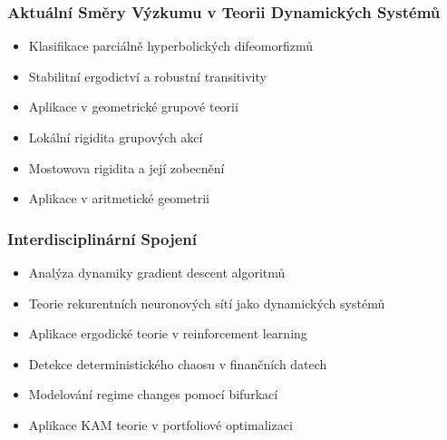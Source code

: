 \subsubsection{Aktuální Směry Výzkumu v Teorii Dynamických Systémů}

\begin{researcharea}
\begin{itemize}
\item Klasifikace parciálně hyperbolických difeomorfizmů
\item Stabilitní ergodictví a robustní transitivity
\item Aplikace v geometrické grupové teorii
\end{itemize}
\end{researcharea}

\begin{researcharea}
\begin{itemize}
\item Lokální rigidita grupových akcí
\item Mostowova rigidita a její zobecnění
\item Aplikace v aritmetické geometrii
\end{itemize}
\end{researcharea}

\subsubsection{Interdisciplinární Spojení}

\begin{application}
\begin{itemize}
\item Analýza dynamiky gradient descent algoritmů
\item Teorie rekurentních neuronových sítí jako dynamických systémů
\item Aplikace ergodické teorie v reinforcement learning
\end{itemize}
\end{application}

\begin{application}
\begin{itemize}
\item Detekce deterministického chaosu v finančních datech
\item Modelování regime changes pomocí bifurkací
\item Aplikace KAM teorie v portfoliové optimalizaci
\end{itemize}
\end{application}

